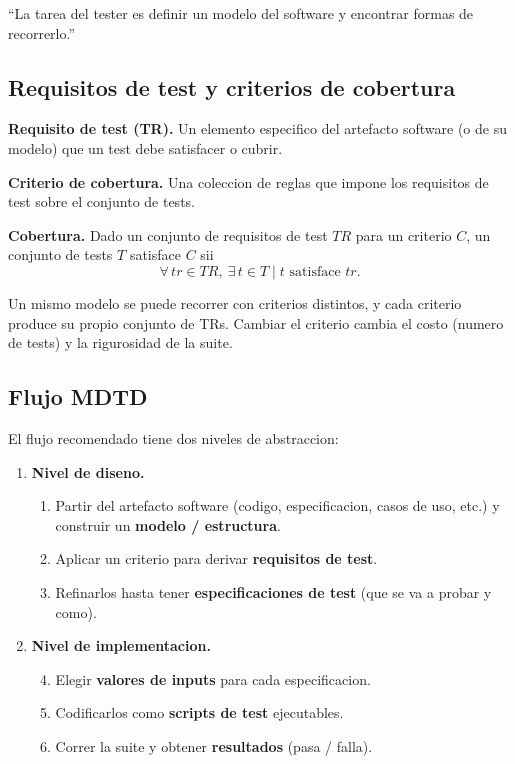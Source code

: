 \documentclass[12pt,a4paper]{article}
\begin{document}
\begin{ideabox}
``La tarea del tester es definir un modelo del software y encontrar formas de recorrerlo.''
\end{ideabox}

\subsection{Requisitos de test y criterios de cobertura}

\begin{definicionbox}
\textbf{Requisito de test (TR).} Un elemento especifico del artefacto software (o de su modelo)
que un test debe satisfacer o cubrir.

\textbf{Criterio de cobertura.} Una coleccion de reglas que impone los requisitos de test sobre el
conjunto de tests.

\textbf{Cobertura.} Dado un conjunto de requisitos de test \(TR\) para un criterio \(C\), un
conjunto de tests \(T\) satisface \(C\) sii
\[
\forall\, tr \in TR,\ \exists\, t \in T \mid t \text{ satisface } tr.
\]
\end{definicionbox}

Un mismo modelo se puede recorrer con criterios distintos, y cada criterio produce su propio
conjunto de TRs. Cambiar el criterio cambia el costo (numero de tests) y la rigurosidad de la
suite.

\subsection{Flujo MDTD}

El flujo recomendado tiene dos niveles de abstraccion:

\begin{enumerate}
  \item \textbf{Nivel de diseno.}
  \begin{enumerate}
    \item Partir del artefacto software (codigo, especificacion, casos de uso, etc.) y construir un
    \textbf{modelo / estructura}.
    \item Aplicar un criterio para derivar \textbf{requisitos de test}.
    \item Refinarlos hasta tener \textbf{especificaciones de test} (que se va a probar y como).
  \end{enumerate}
  \item \textbf{Nivel de implementacion.}
  \begin{enumerate}
    \setcounter{enumii}{3}
    \item Elegir \textbf{valores de inputs} para cada especificacion.
    \item Codificarlos como \textbf{scripts de test} ejecutables.
    \item Correr la suite y obtener \textbf{resultados} (pasa / falla).
  \end{enumerate}
\end{enumerate}
\end{document}
